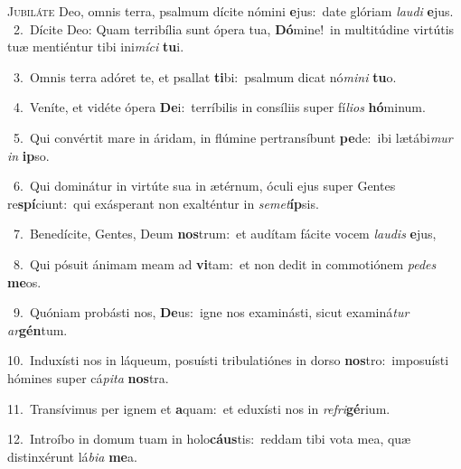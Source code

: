 \lettrine{\initial\textcolor{\initialcolor}{J}}{ubiláte} Deo, omnis terra, psalmum dícite nómini \textbf{e}\-jus:~\star date glóriam \textit{lau}\-\textit{di} \textbf{e}\-jus.\\
{\numbfont\textcolor{\numbcolor}{~2.}}~Dícite Deo: Quam terribília sunt ópera tua, \textbf{Dó}\-mine!~\star in multitúdine virtútis tuæ mentiéntur tibi ini\-\textit{mí}\-\textit{ci} \textbf{tu}\-i.\par
{\numbfont\textcolor{\numbcolor}{~3.}}~Omnis terra adóret te, et psallat \textbf{ti}\-bi:~\star psalmum dicat nó\-\textit{mi}\-\textit{ni} \textbf{tu}\-o.\par
{\numbfont\textcolor{\numbcolor}{~4.}}~Veníte, et vidéte ópera \textbf{De}\-i:~\star terríbilis in consíliis super fí\-\textit{li}\-\textit{os} \textbf{hó}\-minum.\par
{\numbfont\textcolor{\numbcolor}{~5.}}~Qui convértit mare in áridam, in flúmine pertransíbunt \textbf{pe}\-de:~\star ibi lætábi\textit{mur} \textit{in} \textbf{ip}\-so.\par
{\numbfont\textcolor{\numbcolor}{~6.}}~Qui dominátur in virtúte sua in ætérnum, óculi ejus super Gentes re\-\textbf{spí}\-ciunt:~\star qui exásperant non exalténtur in \textit{se}\-\textit{met}\textbf{íp}sis.\par
{\numbfont\textcolor{\numbcolor}{~7.}}~Benedícite, Gentes, Deum \textbf{nos}\-trum:~\star et audítam fácite vocem \textit{lau}\-\textit{dis} \textbf{e}\-jus,\par
{\numbfont\textcolor{\numbcolor}{~8.}}~Qui pósuit ánimam meam ad \textbf{vi}\-tam:~\star et non dedit in commotiónem \textit{pe}\-\textit{des} \textbf{me}\-os.\par
{\numbfont\textcolor{\numbcolor}{~9.}}~Quóniam probásti nos, \textbf{De}\-us:~\star igne nos examinásti, sicut examiná\textit{tur} \textit{ar}\-\textbf{gén}tum.\par
{\numbfont\textcolor{\numbcolor}{10.}}~Induxísti nos in láqueum, posuísti tribulatiónes in dorso \textbf{nos}\-tro:~\star imposuísti hómines super cá\-\textit{pi}\-\textit{ta} \textbf{nos}\-tra.\par
{\numbfont\textcolor{\numbcolor}{11.}}~Transívimus per ignem et \textbf{a}\-quam:~\star et eduxísti nos in \textit{re}\-\textit{fri}\textbf{gé}rium.\par
{\numbfont\textcolor{\numbcolor}{12.}}~Introíbo in domum tuam in holo\-\textbf{cáus}\-tis:~\star reddam tibi vota mea, quæ distinxérunt lá\-\textit{bi}\-\textit{a} \textbf{me}\-a.\par

